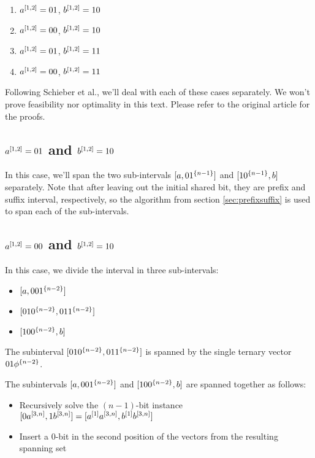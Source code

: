 \begin{enumerate}
\item $a^{[1, 2]} = 01$, $b^{[1, 2]} = 10$
\item $a^{[1, 2]} = 00$, $b^{[1, 2]} = 10$
\item $a^{[1, 2]} = 01$, $b^{[1, 2]} = 11$
\item $a^{[1, 2]} = 00$, $b^{[1, 2]} = 11$
\end{enumerate}

Following Schieber et al.,\cite{Schieber2005154}
we'll deal with each of these cases separately.
We won't prove feasibility nor optimality in this text.
Please refer to the original article for the proofs.

\subsection{\texorpdfstring
{$a^{[1, 2]} = 01$ and $b^{[1, 2]} = 10$}
{a[1,2] = 01 and b[1,2] = 10}
}

In this case,
we'll span the two sub-intervals
$[a, 0 1^{\{n-1\}}]$
and
$[1 0^{\{n-1\}}, b]$
separately.
Note that after leaving out the initial shared bit,
they are prefix and suffix interval, respectively,
so the algorithm from section \ref{sec:prefixsuffix}
is used to span each of the sub-intervals.

\subsection{\texorpdfstring
{$a^{[1, 2]} = 00$ and $b^{[1, 2]} = 10$}
{a[1,2] = 00 and b[1,2] = 10}
}
\label{sec:0010}

In this case,
we divide the interval in three sub-intervals:

\begin{itemize}
\item $[a, 00 1^{\{n-2\}}]$
\item $[01 0^{\{n-2\}}, 01 1^{\{n-2\}}]$
\item $[10 0^{\{n-2\}}, b]$
\end{itemize}

The subinterval
$[01 0^{\{n-2\}}, 01 1^{\{n-2\}}]$
is spanned by the single ternary vector
$01 \phi^{\{n-2\}}$.

The subintervals
$[a, 00 1^{\{n-2\}}]$
and
$[10 0^{\{n-2\}}, b]$
are spanned together as follows:

\begin{itemize}
\item Recursively solve the $(n-1)$-bit instance
$[0 a^{[3, n]}, 1 b^{[3, n]}]
= [a^{[1]} a^{[3, n]}, b^{[1]} b^{[3, n]}]$
\item Insert a $0$-bit in the second position
of the vectors from the resulting spanning set
\end{itemize}

